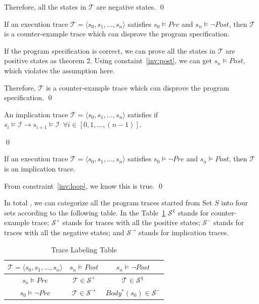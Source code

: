 Therefore, all the states in $\mathcal{T}$ are negative states. \hfill \qed


\begin{theorem}
If an execution trace $\mathcal{T} = \langle s_0, s_1, ..., s_n\rangle$ satisfies $s_0 \models Pre$ and $s_n \models \neg Post$,
then $\mathcal{T}$ is a counter-example trace which can disprove the program specification.
\end{theorem}

If the program specification is correct,
we can prove all the states in $\mathcal{T}$ are positive states as theorem 2.
Using constaint~\ref{inv:post}, we can get $s_n \models Post$, which violates the assumption here.

Therefore, $\mathcal{T}$ is a counter-example trace which can disprove the program specification. \hfill \qed

\begin{definition}
An implication trace $\mathcal{T} = \langle s_0, s_1, ..., s_n\rangle$ satisfies if $s_i \models \mathcal{I} \rightarrow s_{i+1} \models \mathcal{I} ~~\forall i \in [0, 1, ..., (n-1)]$.
\end{definition} \hfill \qed

\begin{theorem}
If an execution trace $\mathcal{T} = \langle s_0, s_1, ..., s_n\rangle$ satisfies $s_0 \models \neg Pre$ and $s_n \models Post$,
then $\mathcal{T}$ is an implication trace.
\end{theorem}
From constraint~\ref{inv:loop}, we know this is true. \hfill \qed




In total , we can categorize all the program traces
started from Set $S$ into four sets according to the following table.
In the Table~\ref{tab:labeling}
$\mathcal{S}^\chi$ stands for counter-example trace;
$\mathcal{S}^+$ stands for traces with all the positive states;
$\mathcal{S}^-$ stands for traces with all the negative states;
and $\mathcal{S}^\rightarrow$ stands for implication traces.

\begin{table}[htb]
\centering
\begin{tabular}[float]{|c|c|c|}
\hline
$\mathcal{T} = \langle s_0, s_1, ..., s_n\rangle$ & $s_n \models Post$            & $s_n \models \neg Post$\\
\hline
$s_o \models Pre$                 & $\mathcal{T} \in \mathcal{S}^+$       		  & $\mathcal{T} \in \mathcal{S}^\chi$\\
\hline
$s_0 \models \neg Pre$            & $\mathcal{T} \in \mathcal{S}^\rightarrow$     & $Body^*(s_0) \in \mathcal{S}^-$\\
\hline
\end{tabular}
\caption{Trace Labeling Table}
\label{tab:labeling}
\end{table}

